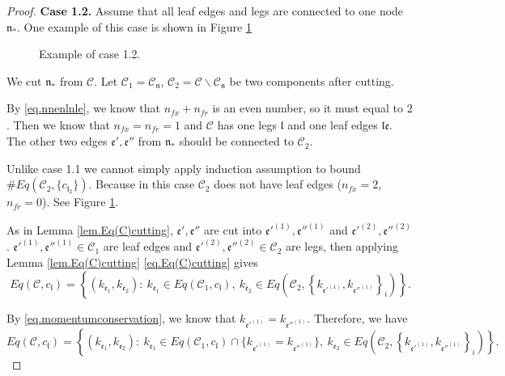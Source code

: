 \begin{proof}
\textbf{Case 1.2.} Assume that all leaf edges and legs are connected to one node $\mathfrak{n}_*$. One example of this case is shown in Figure \ref{fig.examplecase1.2}
\begin{figure}[H]
        \caption{Example of case 1.2.}
        \centering
        \label{fig.examplecase1.2}
    \end{figure}
    
We cut $\mathfrak{n}_*$ from $\mathcal{C}$. Let $\mathcal{C}_1=\mathcal{C}_{\mathfrak{n}}$, $\mathcal{C}_2=\mathcal{C}\backslash \mathcal{C}_{\mathfrak{n}}$ be two components after cutting.

By \eqref{eq.nnenlnle}, we know that $n_{\textit{fx}}+n_{\textit{fr}}$ is an even number, so it must equal to $2$. Then we know that $n_{\textit{fx}}=n_{\textit{fr}}=1$ and $\mathcal{C}$ has one legs $\mathfrak{l}$ and one leaf edges $\mathfrak{l}\mathfrak{e}$. The other two edges $\mathfrak{e}', \mathfrak{e}''$ from $\mathfrak{n}_*$ should be connected to $\mathcal{C}_2$.

Unlike case 1.1 we cannot simply apply induction assumption to bound $\# Eq(\mathcal{C}_{2}, \{c_{\mathfrak{l}_2}\})$. Because in this case $\mathcal{C}_2$ does not have leaf edges ($n_{\textit{fx}}=2$, $n_{\textit{fr}}=0$). See Figure \ref{fig.examplecase1.2}.

As in Lemma \ref{lem.Eq(C)cutting}, $\mathfrak{e}', \mathfrak{e}''$ are cut into $\mathfrak{e}'^{(1)}, \mathfrak{e}''^{(1)}$
and $\mathfrak{e}'^{(2)}, \mathfrak{e}''^{(2)}$. $\mathfrak{e}'^{(1)}, \mathfrak{e}''^{(1)}\in \mathcal{C}_1$ are leaf edges and $\mathfrak{e}'^{(2)}, \mathfrak{e}''^{(2)}\in \mathcal{C}_2$ are legs, then applying Lemma \ref{lem.Eq(C)cutting} \eqref{eq.Eq(C)cutting} gives
\begin{equation}
    Eq(\mathcal{C},c_{\mathfrak{l}})=\left\{(k_{\mathfrak{e}_1},k_{\mathfrak{e}_{2}}):\ k_{\mathfrak{e}_1}\in Eq(\mathcal{C}_1,c_{\mathfrak{l}}),\  k_{\mathfrak{e}_{2}}\in Eq\left(\mathcal{C}_{2}, \left\{k_{\mathfrak{e}'^{(1)}}, k_{\mathfrak{e}''^{(1)}}\right\}_{i}\right)\right\}.
\end{equation}

By \eqref{eq.momentumconservation}, we know that $k_{\mathfrak{e}'^{(1)}}=k_{\mathfrak{e}''^{(1)}}$. Therefore, we have 
\begin{equation}\label{eq.case1.2expand}
    Eq(\mathcal{C},c_{\mathfrak{l}})=\left\{(k_{\mathfrak{e}_1},k_{\mathfrak{e}_{2}}):\ k_{\mathfrak{e}_1}\in Eq(\mathcal{C}_1,c_{\mathfrak{l}})\cap \{k_{\mathfrak{e}'^{(1)}}=k_{\mathfrak{e}''^{(1)}}\},\  k_{\mathfrak{e}_{2}}\in Eq\left(\mathcal{C}_{2}, \left\{k_{\mathfrak{e}'^{(1)}}, k_{\mathfrak{e}''^{(1)}}\right\}_{i}\right)\right\}.
\end{equation}


\end{proof}
